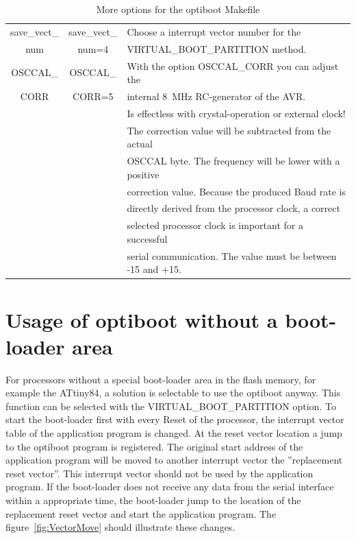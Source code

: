 \begin{table}[H]
\begin{center}
\begin{tabular}{| c | c | l |}
    \hline
 save\_vect\_      & save\_vect\_    & Choose a interrupt vector number for the  \\
      num          &    num=4        & VIRTUAL\_BOOT\_PARTITION method.        \\
    \hline
 OSCCAL\_          & OSCCAL\_       & With the option OSCCAL\_CORR you can adjust the \\
 CORR              & CORR=5         & internal 8~MHz RC-generator of the AVR. \\
                   &                & Is effectless with crystal-operation or external clock! \\
                   &                & The correction value will be subtracted from the actual \\
                   &                & OSCCAL byte. The frequency will be lower with a positive \\
                   &                & correction value. Because the produced Baud rate is \\
                   &                & directly derived from the processor clock, a correct \\
                   &                & selected processor clock is important for a successful \\
                   &                & serial communication. The value must be between -15 and +15. \\
    \hline
    \end{tabular}
  \end{center}
  \caption{More options for the optiboot Makefile}
  \label{tab:options2}
\end{table}

\section{Usage of optiboot without a boot-loader area}

For processors without a special boot-loader area in the flash memory, for example the ATtiny84,
a solution is selectable to use the optiboot anyway.
This function can be selected with the VIRTUAL\_BOOT\_PARTITION option.
To start the boot-loader first with every Reset of the processor, the interrupt
vector table of the application program is changed.
At the reset vector location a jump to the optiboot program is registered.
The original start address of the application program will be moved to
another interrupt vector the ''replacement reset vector''.
This interrupt vector should not be used by the application program.
If the boot-loader does not receive any data from the serial interface within
a appropriate time, the boot-loader jump to the location of the replacement
reset vector and start the application program.
The figure~\ref{fig:VectorMove} should illustrate these changes.

